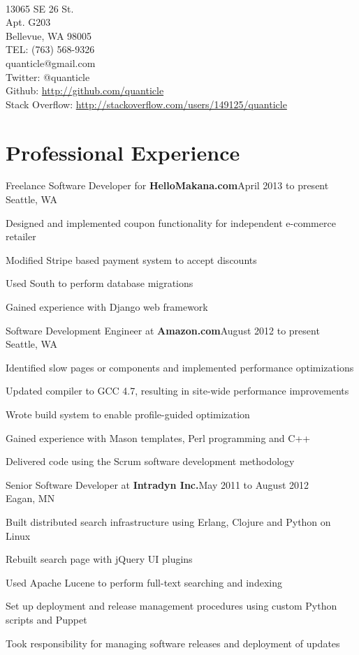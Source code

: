 \documentclass[letterpaper]{article}
\newenvironment{resume-list}
{\begin{itemize}
 \setlength{\itemsep}{0pt}
 \setlength{\parskip}{0pt}}
{\end{itemize}}
\begin{document}
\\
{\small 13065 SE 26\raisebox{0.25em}{th} St.}\\
{\small Apt. G203}\\
{\small Bellevue, WA 98005}\\
{\small TEL: (763) 568-9326}\\
{\small quanticle@gmail.com}\\
{\small Twitter: @quanticle}\\
{\small Github: \url{http://github.com/quanticle}}\\
{\small Stack Overflow: \url{http://stackoverflow.com/users/149125/quanticle}}
\section*{Professional Experience}
\noindent Freelance Software Developer for {\bfseries HelloMakana.com}\dotfill April 2013 to present\\
Seattle, WA
\begin{resume-list}
\item Designed and implemented coupon functionality for independent e-commerce retailer
\item Modified Stripe based payment system to accept discounts
\item Used South to perform database migrations
\item Gained experience with Django web framework 
\end{resume-list}
\noindent Software Development Engineer at {\bfseries Amazon.com}\dotfill August 2012 to present\\
Seattle, WA
\begin{resume-list}
\item Identified slow pages or components and implemented performance optimizations
\item Updated compiler to GCC 4.7, resulting in site-wide performance improvements
\item Wrote build system to enable profile-guided optimization
\item Gained experience with Mason templates, Perl programming and C++ 
\item Delivered code using the Scrum software development methodology
\end{resume-list}
\noindent Senior Software Developer at {\bfseries Intradyn Inc.}\dotfill May 2011 to August 2012\\
Eagan, MN
\begin{resume-list}
\item Built distributed search infrastructure using Erlang, Clojure and Python on Linux
\item Rebuilt search page with jQuery UI plugins
\item Used Apache Lucene to perform full-text searching and indexing
\item Set up deployment and release management procedures using custom Python scripts and Puppet
\item Took responsibility for managing software releases and deployment of updates
\end{resume-list}
\end{document}
